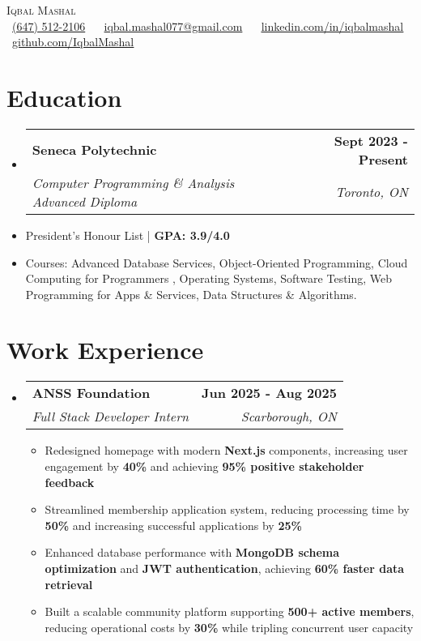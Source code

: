 \documentclass[letterpaper,11pt]{article}
\makeatletter
\newcommand{\resumeItem}[1]{
  \item\small{
    {#1 \vspace{0pt}}
  }
}
\newcommand{\resumeSubheading}[4]{
  \vspace{-2pt}\item
    \begin{tabular*}{1.0\textwidth}[t]{l@{\extracolsep{\fill}}r}
      \textbf{#1} & \textbf{\small #2} \\
      \textit{\small#3} & \textit{\small #4} \\
    \end{tabular*}\vspace{-7pt}
}
\newcommand{\resumeSubHeadingListStart}{\begin{itemize}[leftmargin=0.0in, label={}]}
\newcommand{\resumeSubHeadingListEnd}{\end{itemize}}\vspace{0pt}
\newcommand{\resumeItemListStart}{\begin{itemize}}
\newcommand{\resumeItemListEnd}{\end{itemize}\vspace{-5pt}}
\makeatother
\begin{document}
\begin{center}
    {\Large \scshape Iqbal Mashal} \\[2mm]
    \footnotesize 
    \raisebox{-0.1\height}{\faPhone} \ \underline{(647) 512-2106} ~
    \raisebox{-0.1\height}{\faEnvelope} \ \underline{iqbal.mashal077@gmail.com} ~
    \raisebox{-0.1\height}{\faLinkedin} \ \underline{\href{https://www.linkedin.com/in/iqbalmashal/}{linkedin.com/in/iqbalmashal}} ~
    \raisebox{-0.1\height}{\faGithub} \ \underline{\href{https://github.com/IqbalMashal}{github.com/IqbalMashal}}
    \vspace{-8pt}
\end{center}

\section{Education}
\resumeSubHeadingListStart
    \resumeSubheading
        {Seneca Polytechnic}{Sept 2023 - Present}
        {Computer Programming \& Analysis Advanced Diploma}{Toronto, ON}
\resumeSubHeadingListEnd
\resumeItemListStart
    \resumeItem{President's Honour List | \textbf{GPA: 3.9/4.0}}
    \resumeItem{Courses: Advanced Database Services, Object-Oriented Programming, Cloud Computing for Programmers , Operating Systems, Software Testing, Web Programming for Apps \& Services, Data Structures \& Algorithms.}
\resumeItemListEnd
\vspace{-12pt}

\section{Work Experience}
\resumeSubHeadingListStart
    \resumeSubheading
        {ANSS Foundation}{Jun 2025 - Aug 2025}
        {Full Stack Developer Intern}{Scarborough, ON}
        \resumeItemListStart
            \resumeItem{Redesigned homepage with modern \textbf{Next.js} components, increasing user engagement by \textbf{40\%} and achieving \textbf{95\% positive stakeholder feedback}}
            \resumeItem{Streamlined membership application system, reducing processing time by \textbf{50\%} and increasing successful applications by \textbf{25\%}}
            \resumeItem{Enhanced database performance with \textbf{MongoDB schema optimization} and \textbf{JWT authentication}, achieving \textbf{60\% faster data retrieval}}
            \resumeItem{Built a scalable community platform supporting \textbf{500+ active members}, reducing operational costs by \textbf{30\%} while tripling concurrent user capacity}
        \resumeItemListEnd
\resumeSubHeadingListEnd
\vspace{-12pt}
\end{document}
